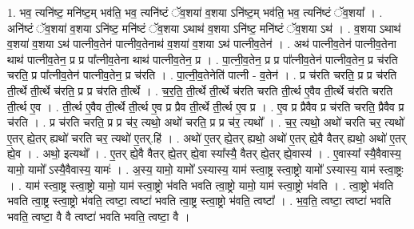 \documentclass[17pt]{extarticle}
\begin{document}
1. भव॒ त्यनि॑ष्ट॒ मनि॑ष्ट॒म् भव॑ति॒ भव॒ त्यनि॑ष्टं ॅव॒शया॑ व॒शया ऽनि॑ष्ट॒म् भव॑ति॒ भव॒ त्यनि॑ष्टं ॅव॒शया᳚ । . अनि॑ष्टं ॅव॒शया॑ व॒शया ऽनि॑ष्ट॒ मनि॑ष्टं ॅव॒शया ऽथाथ॑ व॒शया ऽनि॑ष्ट॒ मनि॑ष्टं ॅव॒शया ऽथ॑ । . व॒शया ऽथाथ॑ व॒शया॑ व॒शया ऽथ॑ पात्नीव॒तेन॑ पात्नीव॒तेनाथ॑ व॒शया॑ व॒शया ऽथ॑ पात्नीव॒तेन॑ । . अथ॑ पात्नीव॒तेन॑ पात्नीव॒तेना थाथ॑ पात्नीव॒तेन॒ प्र प्र पा᳚त्नीव॒तेना थाथ॑ पात्नीव॒तेन॒ प्र । . पा॒त्नी॒व॒तेन॒ प्र प्र पा᳚त्नीव॒तेन॑ पात्नीव॒तेन॒ प्र च॑रति चरति॒ प्र पा᳚त्नीव॒तेन॑ पात्नीव॒तेन॒ प्र च॑रति । . पा॒त्नी॒व॒तेनेति॑ पात्नी - व॒तेन॑ । . प्र च॑रति चरति॒ प्र प्र च॑रति ती॒र्त्थे ती॒र्त्थे च॑रति॒ प्र प्र च॑रति ती॒र्त्थे । . च॒र॒ति॒ ती॒र्त्थे ती॒र्त्थे च॑रति चरति ती॒र्त्थ ए॒वैव ती॒र्त्थे च॑रति चरति ती॒र्त्थ ए॒व । . ती॒र्त्थ ए॒वैव ती॒र्त्थे ती॒र्त्थ ए॒व प्र प्रैव ती॒र्त्थे ती॒र्त्थ ए॒व प्र । . ए॒व प्र प्रैवैव प्र च॑रति चरति॒ प्रैवैव प्र च॑रति । . प्र च॑रति चरति॒ प्र प्र च॑र॒ त्यथो॒ अथो॑ चरति॒ प्र प्र च॑र॒ त्यथो᳚ । . च॒र॒ त्यथो॒ अथो॑ चरति चर॒ त्यथो॑ ए॒तर् ह्ये॒तर् ह्यथो॑ चरति चर॒ त्यथो॑ ए॒तर्.हि॑ । . अथो॑ ए॒तर् ह्ये॒तर् ह्यथो॒ अथो॑ ए॒तर् ह्ये॒वै वैतर् ह्यथो॒ अथो॑ ए॒तर् ह्ये॒व । . अथो॒ इत्यथो᳚ । . ए॒तर् ह्ये॒वै वैतर् ह्ये॒तर् ह्ये॒वा स्या᳚स्यै॒ वैतर् ह्ये॒तर् ह्ये॒वास्य॑ । . ए॒वास्या᳚ स्यै॒वैवास्य॒ यामो॒ यामो᳚ ऽस्यै॒वैवास्य॒ यामः॑ । . अ॒स्य॒ यामो॒ यामो᳚ ऽस्यास्य॒ याम॑ स्त्वा॒ष्ट्र स्त्वा॒ष्ट्रो यामो᳚ ऽस्यास्य॒ याम॑ स्त्वा॒ष्ट्रः । . याम॑ स्त्वा॒ष्ट्र स्त्वा॒ष्ट्रो यामो॒ याम॑ स्त्वा॒ष्ट्रो भ॑वति भवति त्वा॒ष्ट्रो यामो॒ याम॑ स्त्वा॒ष्ट्रो भ॑वति । . त्वा॒ष्ट्रो भ॑वति भवति त्वा॒ष्ट्र स्त्वा॒ष्ट्रो भ॑वति॒ त्वष्टा॒ त्वष्टा॑ भवति त्वा॒ष्ट्र स्त्वा॒ष्ट्रो भ॑वति॒ त्वष्टा᳚ । . भ॒व॒ति॒ त्वष्टा॒ त्वष्टा॑ भवति भवति॒ त्वष्टा॒ वै वै त्वष्टा॑ भवति भवति॒ त्वष्टा॒ वै । \newline
\end{document}

